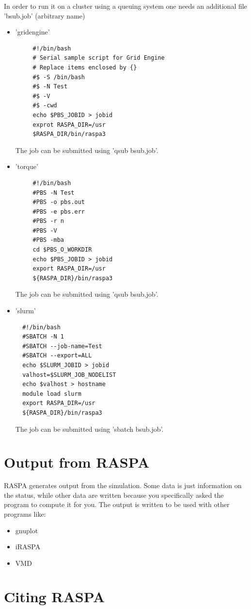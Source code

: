 In order to run it on a cluster using a queuing system one needs an additional file 'bsub.job' (arbitrary name)
\begin{itemize}
 \item{'gridengine'}
  \begin{verbatim}
     #!/bin/bash
     # Serial sample script for Grid Engine
     # Replace items enclosed by {}
     #$ -S /bin/bash
     #$ -N Test
     #$ -V
     #$ -cwd
     echo $PBS_JOBID > jobid
     exprot RASPA_DIR=/usr
     $RASPA_DIR/bin/raspa3
  \end{verbatim}
The job can be submitted using 'qsub bsub.job'.
 \item{'torque'}
  \begin{verbatim}
     #!/bin/bash
     #PBS -N Test
     #PBS -o pbs.out
     #PBS -e pbs.err
     #PBS -r n
     #PBS -V
     #PBS -mba
     cd $PBS_O_WORKDIR
     echo $PBS_JOBID > jobid
     export RASPA_DIR=/usr
     ${RASPA_DIR}/bin/raspa3
  \end{verbatim}
The job can be submitted using 'qsub bsub.job'.
 \item{'slurm'}
\begin{verbatim}
  #!/bin/bash 
  #SBATCH -N 1
  #SBATCH --job-name=Test
  #SBATCH --export=ALL
  echo $SLURM_JOBID > jobid
  valhost=$SLURM_JOB_NODELIST
  echo $valhost > hostname
  module load slurm
  export RASPA_DIR=/usr
  ${RASPA_DIR}/bin/raspa3
\end{verbatim}
The job can be submitted using 'sbatch bsub.job'.
\end{itemize}


\section{Output from RASPA}
RASPA generates output from the simulation. Some data is just information on the status, while other data are written because you
specifically asked the program to compute it for you. The output is written to be used with other programs like:
\begin{itemize}
 \item{gnuplot}
 \item{iRASPA}
 \item{VMD}
\end{itemize}

\section{Citing RASPA}

